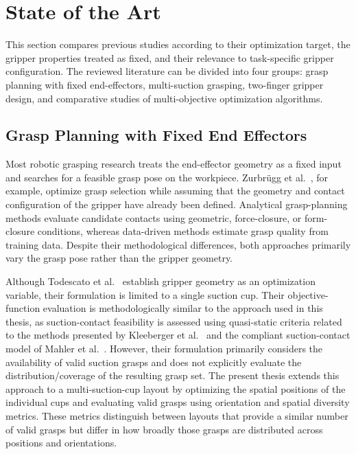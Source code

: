 \section{State of the Art}
\label{sec:state_of_the_art}

This section compares previous studies according to their optimization target, the gripper properties treated as fixed, and their relevance to
task-specific gripper configuration. The reviewed literature can be divided into four groups: grasp planning with fixed end-effectors, multi-suction
grasping, two-finger gripper design, and comparative studies of multi-objective optimization algorithms.

\subsection{Grasp Planning with Fixed End Effectors}

Most robotic grasping research treats the end-effector geometry as a fixed input and searches for a feasible grasp pose on the workpiece. Zurbr\"ugg
et al.\ \cite{Zurbruegg2025GraspQP}, for example, optimize grasp selection while assuming that the geometry and contact configuration of the gripper
have already been defined. Analytical grasp-planning methods evaluate candidate contacts using geometric, force-closure, or form-closure conditions,
whereas data-driven methods estimate grasp quality from training data. Despite their methodological differences, both approaches primarily vary the
grasp pose rather than the gripper geometry.

Although Todescato et al.\ \cite{Todescato} establish gripper geometry as an optimization variable, their formulation is limited to a single suction
cup. Their objective-function evaluation is methodologically similar to the approach used in this thesis, as suction-contact feasibility is assessed
using quasi-static criteria related to the methods presented by Kleeberger et al.\ \cite{Kleeberger} and the compliant suction-contact model of
Mahler et al.\ \cite{SC_quasi_static}. However, their formulation primarily considers the availability of valid suction grasps and does not explicitly
evaluate the distribution/coverage of the resulting grasp set. The present thesis extends this approach to a multi-suction-cup layout by optimizing
the spatial positions of the individual cups and evaluating valid grasps using orientation and spatial diversity metrics. These metrics distinguish
between layouts that provide a similar number of valid grasps but differ in how broadly those grasps are distributed across positions and
orientations.

